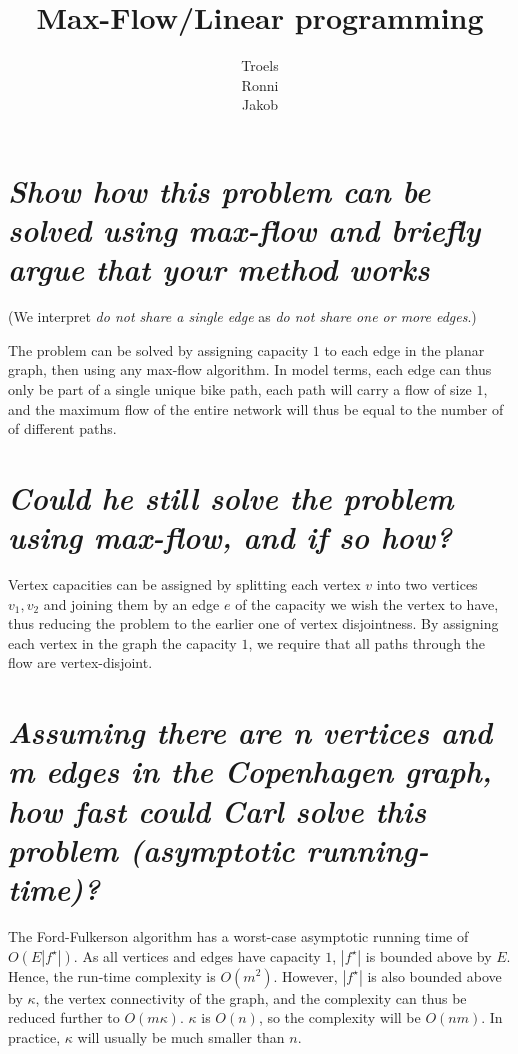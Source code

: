 \documentclass[a4paper, oneside, final]{memoir}
\begin{document}
\title{Max-Flow/Linear programming}
\author{Troels\\Ronni\\Jakob}
\maketitle

\setcounter{chapter}{1}

\section{\textit{Show how this problem can be solved using max-flow
    and briefly argue that your method works}}

(We interpret \textit{do not share a single edge} as \textit{do not
  share one or more edges}.)

The problem can be solved by assigning capacity $1$ to each edge in
the planar graph, then using any max-flow algorithm.  In model terms,
each edge can thus only be part of a single unique bike path, each
path will carry a flow of size $1$, and the maximum flow of the entire
network will thus be equal to the number of of different paths.

\section{\textit{Could he still solve the problem using max-flow, and
    if so how?}}

Vertex capacities can be assigned by splitting each vertex $v$ into
two vertices $v_1, v_2$ and joining them by an edge $e$ of the
capacity we wish the vertex to have, thus reducing the problem to the
earlier one of vertex disjointness.  By assigning each vertex in the
graph the capacity $1$, we require that all paths through the flow are
vertex-disjoint.

\section{\textit{Assuming there are n vertices and m edges in the
    Copenhagen graph, how fast could Carl solve this problem
    (asymptotic running-time)?}}

The Ford-Fulkerson algorithm has a worst-case asymptotic running time
of $O(E|f^\star|)$.  As all vertices and edges have capacity $1$,
$|f^\star|$ is bounded above by $E$.  Hence, the run-time complexity
is $O(m^2)$.  However, $|f^\star|$ is also bounded above by $\kappa$,
the vertex connectivity of the graph, and the complexity can thus be
reduced further to $O(m\kappa)$.  $\kappa$ is $O(n)$, so the
complexity will be $O(n m)$.  In practice, $\kappa$ will usually be
much smaller than $n$.
\end{document}

